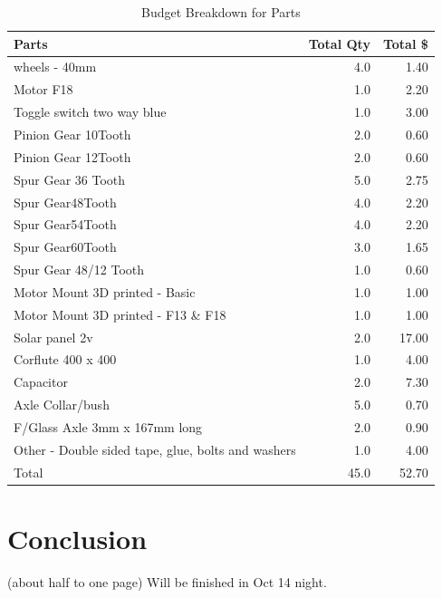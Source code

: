 \documentclass[12pt]{article}
\begin{document}
\begin{table}[h] 
\centering 
\begin{tabularx}{\textwidth}{Xrr}
\toprule
Parts & Total Qty & Total \$ \\
\midrule
wheels - 40mm & 4.0 & 1.40 \\
Motor F18 & 1.0 & 2.20 \\
Toggle switch two way blue & 1.0 & 3.00 \\
Pinion Gear 10Tooth & 2.0 & 0.60 \\
Pinion Gear 12Tooth & 2.0 & 0.60 \\
Spur Gear 36 Tooth & 5.0 & 2.75 \\
Spur Gear48Tooth & 4.0 & 2.20 \\
Spur Gear54Tooth & 4.0 & 2.20 \\
Spur Gear60Tooth & 3.0 & 1.65 \\
Spur Gear 48/12 Tooth & 1.0 & 0.60 \\
Motor Mount 3D printed - Basic & 1.0 & 1.00 \\
Motor Mount 3D printed - F13 \& F18 & 1.0 & 1.00 \\
Solar panel 2v & 2.0 & 17.00 \\
Corflute 400 x 400 & 1.0 & 4.00 \\
Capacitor & 2.0 & 7.30 \\
Axle Collar/bush & 5.0 & 0.70 \\
F/Glass Axle 3mm x 167mm long & 2.0 & 0.90 \\
Other - Double sided tape, glue, bolts and washers & 1.0 & 4.00 \\
\midrule
Total & 45.0 & 52.70 \\
\bottomrule
\end{tabularx}
\caption{Budget Breakdown for Parts}
\end{table}
\section{Conclusion}
(about half to one page)
Will be finished in Oct 14 night.

\newpage
{}
\printbibliography

\newpage
\end{document}
